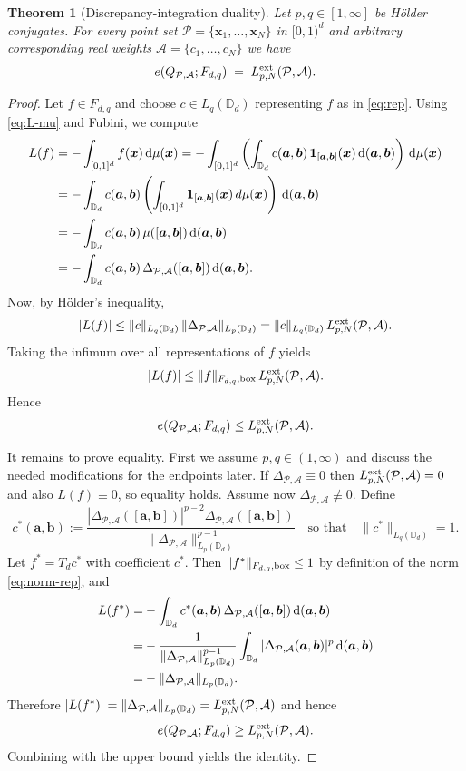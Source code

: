 \documentclass[12pt]{article}
\newtheorem{thm}{Theorem}
\theoremstyle{remark}
\theoremstyle{definition}
\newcommand{\D}{\mathbb{D}}
\newcommand{\ex}{{\rm ext}}
\newcommand{\bx}{{\rm box}}
\newcommand{\rd}{\,{\rm d}}
\newcommand{\bsx}{{\boldsymbol x}}
\newcommand{\bsa}{{\boldsymbol a}}
\newcommand{\bsb}{{\boldsymbol b}}
\newcommand{\cP}{\mathcal{P}}
\newcommand{\cA}{\mathcal{A}}
\newcommand{\<}{\langle}
\renewcommand{\>}{\rangle}
\begin{document}
\begin{thm}[Discrepancy-integration duality]\label{thm:main}
Let $p,q \in [1,\infty ]$ be H\"older conjugates. For every point set 
$\cP=\{\bsx_1,\ldots,\bsx_N\}$ in $[0,1)^d$ and arbitrary corresponding real weights $\cA=\{c_1,\ldots,c_N\}$ we have
\[
e(Q_{\cP,\cA};F_{d,q}) \;=\; L_{p,N}^{\ex}(\cP,\cA).
\]
\end{thm}


\begin{proof}
Let $f\in F_{d,q}$ and choose $c\in L_q(\D_d)$ representing $f$ as in \eqref{eq:rep}.
Using \eqref{eq:L-mu} and Fubini, we compute
\begin{align*}
L(f)
&= -\int_{[0,1]^d}  f(\bsx) \rd\mu(\bsx)
= -\int_{[0,1]^d} \left(\int_{\D_d} c(\bsa,\bsb) \,{\bf 1}_{[\bsa,\bsb]}(\bsx)\rd (\bsa,\bsb)\right) \rd \mu(\bsx)\\
&= -\int_{\D_d} c(\bsa,\bsb)\left(\int_{[0,1]^d} {\bf 1}_{[\bsa,\bsb]}(\bsx)\,d\mu(\bsx)\right) \rd (\bsa,\bsb)\\
&= -\int_{\D_d} c(\bsa,\bsb) \,\mu([\bsa,\bsb]) \rd (\bsa,\bsb)\\
&= -\int_{\D_d} c(\bsa,\bsb)\,\Delta_{\cP,\cA}([\bsa,\bsb]) \rd (\bsa,\bsb).
\end{align*}
Now, by Hölder's inequality,
\[
|L(f)|
\le \|c\|_{L_q(\D_d)}\,\|\Delta_{\cP,\cA}\|_{L_p(\D_d)}
= \|c\|_{L_q(\D_d)}\,L_{p,N}^{\ex}(\cP,\cA).
\]
Taking the infimum over all representations of $f$ yields
\[
|L(f)| \le \|f\|_{F_{d,q},\bx}\,L_{p,N}^{\ex}(\cP,\cA).
\]
Hence $$e(Q_{\cP,\cA};F_{d,q})\le L_{p,N}^{\ex}(\cP,\cA).$$

It remains to prove equality. First we assume $p,q \in (1, \infty)$ and discuss the needed modifications 
for the endpoints later. If $\Delta_{\cP,\cA} \equiv 0$ then $L_{p,N}^{\ex}(\cP,\cA)=0$ and also $L(f)\equiv 0$, 
so equality holds. Assume now $\Delta_{\cP,\cA}\not\equiv 0$. Define 
\begin{equation}\label{eq:cstar}
c^{\ast}(\bsa,\bsb):=\frac{|\Delta_{\cP,\cA}([\bsa,\bsb])|^{p-2} \Delta_{\cP,\cA}([\bsa,\bsb])}{\|\Delta_{\cP,\cA}\|_{L_p(\D_d)}^{p-1}}
\quad\text{so that}\quad
\|c^{\ast}\|_{L_q(\D_d)}=1.
\end{equation}
Let $f^\ast=T_d c^\ast$ with coefficient $c^\ast$. Then $\|f^\ast\|_{F_{d,q},\bx}\le 1$ by definition of the norm \eqref{eq:norm-rep}, and
\begin{align*}
L(f^\ast)
= & -\int_{\D_d} c^\ast(\bsa,\bsb)\,\Delta_{\cP,\cA}([\bsa,\bsb])\rd (\bsa,\bsb) \\
= & -\frac{1}{\|\Delta_{\cP,\cA}\|_{L_p(\D_d)}^{p-1}}\int_{\D_d}|\Delta_{\cP,\cA}(\bsa,\bsb)|^p \rd (\bsa,\bsb)\\
= & -\|\Delta_{\cP,\cA}\|_{L_p(\D_d)}.
\end{align*}
Therefore $|L(f^\ast)|=\|\Delta_{\cP,\cA}\|_{L_p(\D_d)}=L_{p,N}^{\ex}(\cP,\cA)$ and hence
$$e(Q_{\cP,\cA};F_{d,q})\ge L_{p,N}^{\ex}(\cP,\cA).$$ Combining with the upper bound yields the identity.


\end{proof}
\end{document}
